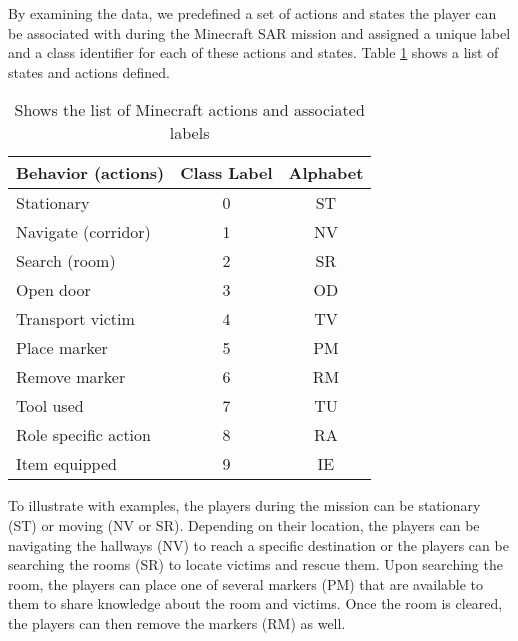 \documentclass{article}
\begin{document}
By examining the data, we predefined a set of actions and states the player can be
associated with during the Minecraft SAR mission and assigned a unique label and a
class identifier for each of these actions and states. Table \ref{table:1} shows a list of states
and actions defined.  

\begin{table}[h!]
    \centering
    \begin{tabular}{|l|c|c|}
    \hline
    \textbf{Behavior (actions)} & \textbf{Class Label} & \textbf{Alphabet} \\[1em]
    \hline
    Stationary & 0 & ST \\[0.5em]
    Navigate (corridor) & 1 & NV \\[0.5em]
    Search (room) & 2 & SR \\[0.5em]
    Open door & 3 & OD \\[0.5em]
    Transport victim & 4 & TV \\[0.5em]
    Place marker & 5 & PM \\[0.5em]
    Remove marker & 6 & RM \\[0.5em]
    Tool used & 7 & TU \\[0.5em]
    Role specific action & 8 & RA \\[0.5em]
    Item equipped & 9 & IE \\[0.5em]
    \hline
    \end{tabular}
    \caption{Shows the list of Minecraft actions and associated labels}
    \label{table:1}
\end{table}

To illustrate with examples, the players during the mission can be stationary (ST) or moving (NV or SR). Depending on their location, the players can be navigating the hallways (NV) to reach a specific destination or the players can be searching the rooms (SR) to locate victims and rescue them. Upon searching the room, the players can place one of several markers (PM) that are available to them to share knowledge about the room and victims. Once the room is cleared, the players can then remove the markers (RM) as well.
\end{document}
